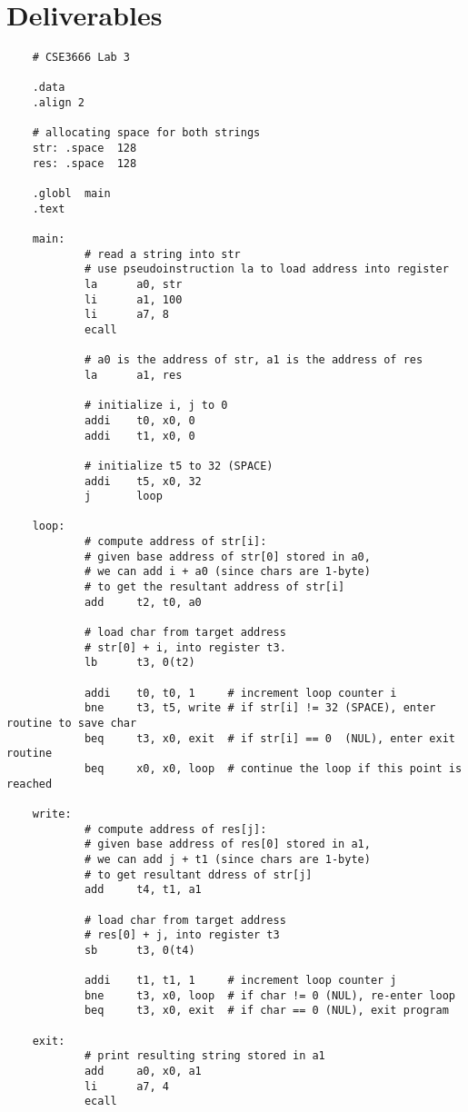 \documentclass{article}
\begin{document}
\section{Deliverables}
    \begin{lstlisting}
    # CSE3666 Lab 3

    .data
    .align 2

    # allocating space for both strings
    str: .space  128
    res: .space  128

    .globl  main
    .text

    main:   
            # read a string into str
            # use pseudoinstruction la to load address into register
            la      a0, str
            li      a1, 100
            li      a7, 8
            ecall

            # a0 is the address of str, a1 is the address of res
            la      a1, res

            # initialize i, j to 0
            addi    t0, x0, 0 
            addi    t1, x0, 0 
            
            # initialize t5 to 32 (SPACE)
            addi 	t5, x0, 32
            j       loop
        
    loop:
            # compute address of str[i]:
            # given base address of str[0] stored in a0,
            # we can add i + a0 (since chars are 1-byte)
            # to get the resultant address of str[i]
            add     t2, t0, a0

            # load char from target address
            # str[0] + i, into register t3.
            lb      t3, 0(t2)

            addi    t0, t0, 1     # increment loop counter i
            bne     t3, t5, write # if str[i] != 32 (SPACE), enter routine to save char
            beq     t3, x0, exit  # if str[i] == 0  (NUL), enter exit routine
            beq     x0, x0, loop  # continue the loop if this point is reached

    write:
            # compute address of res[j]:
            # given base address of res[0] stored in a1,
            # we can add j + t1 (since chars are 1-byte)
            # to get resultant ddress of str[j]
            add     t4, t1, a1

            # load char from target address
            # res[0] + j, into register t3
            sb      t3, 0(t4)

            addi    t1, t1, 1     # increment loop counter j
            bne     t3, x0, loop  # if char != 0 (NUL), re-enter loop
            beq     t3, x0, exit  # if char == 0 (NUL), exit program

    exit:  
            # print resulting string stored in a1
            add     a0, x0, a1
            li      a7, 4
            ecall
    \end{lstlisting}
\end{document}
